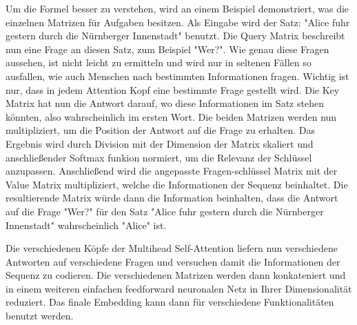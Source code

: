 Um die Formel besser zu verstehen, wird an einem Beispiel demonstriert, was die einzelnen Matrizen für Aufgaben besitzen.
Als Eingabe wird der Satz: "Alice fuhr gestern durch die Nürnberger Innenstadt" benutzt.
Die Query Matrix beschreibt nun eine Frage an diesen Satz, zum Beispiel "Wer?".
Wie genau diese Fragen aussehen, ist nicht leicht zu ermitteln und wird nur in seltenen Fällen so ausfallen, wie auch Menschen nach bestimmten Informationen fragen.
Wichtig ist nur, dass in jedem Attention Kopf eine bestimmte Frage gestellt wird.
Die Key Matrix hat nun die Antwort darauf, wo diese Informationen im Satz stehen könnten, also wahrscheinlich im ersten Wort. 
Die beiden Matrizen werden nun multipliziert, um die Position der Antwort auf die Frage zu erhalten. 
Das Ergebnis wird durch Division mit der Dimension der Matrix skaliert und anschließender Softmax funkion normiert, um die Relevanz der Schlüssel anzupassen.
Anschließend wird die angepasste Fragen-schlüssel Matrix mit der Value Matrix multipliziert, welche die Informationen der Sequenz beinhaltet. 
Die resultierende Matrix würde dann die Information beinhalten, dass die Antwort auf die Frage "Wer?" für den Satz "Alice fuhr gestern durch die Nürnberger Innenstadt" wahrscheinlich "Alice" ist.

Die verschiedenen Köpfe der Multihead Self-Attention liefern nun verschiedene Antworten auf verschiedene Fragen und versuchen damit die Informationen der Sequenz zu codieren.
Die verschiedenen Matrizen werden dann konkateniert und in einem weiteren einfachen feedforward neuronalen Netz in Ihrer Dimensionalität reduziert.
Das finale Embedding kann dann für verschiedene Funktionalitäten benutzt werden.


